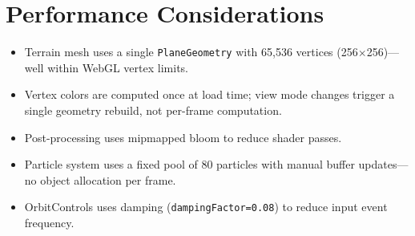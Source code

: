 \section{Performance Considerations}
\begin{itemize}
    \item Terrain mesh uses a single \texttt{PlaneGeometry} with 65,536 vertices (256$\times$256)---well within WebGL vertex limits.
    \item Vertex colors are computed once at load time; view mode changes trigger a single geometry rebuild, not per-frame computation.
    \item Post-processing uses mipmapped bloom to reduce shader passes.
    \item Particle system uses a fixed pool of 80 particles with manual buffer updates---no object allocation per frame.
    \item OrbitControls uses damping (\texttt{dampingFactor=0.08}) to reduce input event frequency.
\end{itemize}
